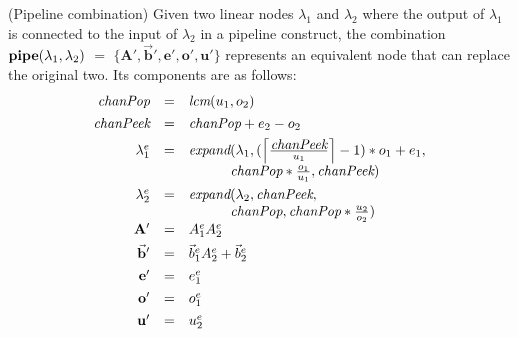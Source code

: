 \begin{transformation} (Pipeline combination)
Given two linear nodes $\lambda_1$ and $\lambda_2$ where the output of
$\lambda_1$ is connected to the input of $\lambda_2$ in a pipeline
construct, the combination $\mbox{\bf pipe}(\lambda_1, \lambda_2)$ $=$
$\{\mathbf{A}', \vec{\mathbf{b}}', \mathbf{e}', \mathbf{o}', \mathbf{u}'\}$ 
represents an equivalent node that
can replace the original two.  Its components are as follows:
\begin{equation} \nonumber
\begin{array}{rcl}
\mt{chanPop} & = & \mt{lcm}(u_1, o_2) \\ ~ \vspace{-8pt} \\
\mt{chanPeek} & = & \mt{chanPop} + e_2 - o_2 \\ ~ \vspace{-8pt} \\
\lambda_1^e & = & \mt{expand}(\lambda_1, (\left \lceil \frac{\mt{chanPeek}}{u_1} \right \rceil - 1) * o_1 + e_1, \\
~ & ~ & ~\hspace{0.32in}~ \mt{chanPop} * \frac{o_1}{u_1}, \mt{chanPeek}) \\ ~ \vspace{-8pt} \\
\lambda_2^e & = & \mt{expand}(\lambda_2, \mt{chanPeek}, \\
~ & ~ & ~\hspace{0.32in}~ \mt{chanPop}, \mt{chanPop} * \frac{u_2}{o_2}) \\
\mathbf{A'} & = & A_1^e A_2^e \\ ~ \vspace{-8pt} \\
\vec{\mathbf{b}}' & = & {\vec b}_1^e A_2^e + {\vec b}_2^e \\ ~ \vspace{-8pt} \\
\mathbf{e'} & = & e_1^e \\ ~ \vspace{-8pt} \\
\mathbf{o'} & = & o_1^e \\ ~ \vspace{-8pt} \\
\mathbf{u'} & = & u_2^e
\end{array}
\end{equation}
\end{transformation}

